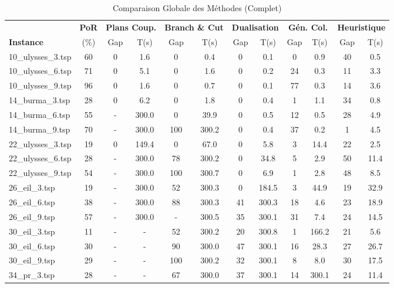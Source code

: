 \begin{table}[H]
\centering
\caption{Comparaison Globale des Méthodes (Complet)}
\scriptsize
\setlength{\tabcolsep}{3pt}
\begin{tabular}{|l|c||cc|cc|cc|cc|cc|}
\hline
 & \textbf{PoR} & \multicolumn{2}{c|}{\textbf{Plans Coup.}} & \multicolumn{2}{c|}{\textbf{Branch \& Cut}} & \multicolumn{2}{c|}{\textbf{Dualisation}} & \multicolumn{2}{c|}{\textbf{Gén. Col.}} & \multicolumn{2}{c|}{\textbf{Heuristique}} \\
\textbf{Instance} & (\%) & Gap & T(s) & Gap & T(s) & Gap & T(s) & Gap & T(s) & Gap & T(s) \\
\hline
10\_ulysses\_3.tsp & 60 & 0 & 1.6 & 0 & 0.4 & 0 & 0.1 & 0 & 0.9 & 40 & 0.5 \\
10\_ulysses\_6.tsp & 71 & 0 & 5.1 & 0 & 1.6 & 0 & 0.2 & 24 & 0.3 & 11 & 3.3 \\
10\_ulysses\_9.tsp & 96 & 0 & 1.6 & 0 & 0.7 & 0 & 0.1 & 77 & 0.3 & 14 & 3.6 \\
14\_burma\_3.tsp & 28 & 0 & 6.2 & 0 & 1.8 & 0 & 0.4 & 1 & 1.1 & 34 & 0.8 \\
14\_burma\_6.tsp & 55 & - & 300.0 & 0 & 39.9 & 0 & 0.5 & 12 & 0.5 & 28 & 4.9 \\
14\_burma\_9.tsp & 70 & - & 300.0 & 100 & 300.2 & 0 & 0.4 & 37 & 0.2 & 1 & 4.5 \\
22\_ulysses\_3.tsp & 19 & 0 & 149.4 & 0 & 67.0 & 0 & 5.8 & 3 & 14.4 & 22 & 2.5 \\
22\_ulysses\_6.tsp & 28 & - & 300.0 & 78 & 300.2 & 0 & 34.8 & 5 & 2.9 & 50 & 11.4 \\
22\_ulysses\_9.tsp & 54 & - & 300.0 & 100 & 300.7 & 0 & 6.9 & 1 & 2.8 & 48 & 8.5 \\
26\_eil\_3.tsp & 19 & - & 300.0 & 52 & 300.3 & 0 & 184.5 & 3 & 44.9 & 19 & 32.9 \\
26\_eil\_6.tsp & 38 & - & 300.0 & 88 & 300.3 & 41 & 300.3 & 18 & 4.6 & 23 & 18.9 \\
26\_eil\_9.tsp & 57 & - & 300.0 & - & 300.5 & 35 & 300.1 & 31 & 7.4 & 24 & 14.5 \\
30\_eil\_3.tsp & 11 & - & - & 52 & 300.2 & 20 & 300.8 & 1 & 166.2 & 21 & 5.6 \\
30\_eil\_6.tsp & 30 & - & - & 90 & 300.0 & 47 & 300.1 & 16 & 28.3 & 27 & 26.7 \\
30\_eil\_9.tsp & 29 & - & - & 100 & 300.2 & 32 & 300.1 & 8 & 8.0 & 30 & 17.5 \\
34\_pr\_3.tsp & 28 & - & - & 67 & 300.0 & 37 & 300.1 & 14 & 300.1 & 24 & 11.4 \\

\end{tabular}
\end{table}
